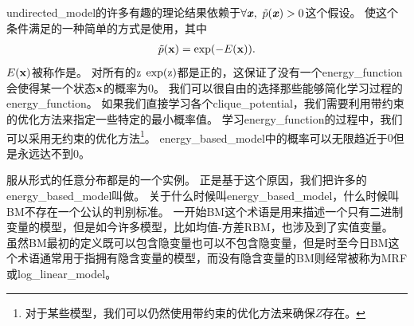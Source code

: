 \subsection{}
\label{sec:energy_based_models}


\gls{undirected_model}的许多有趣的理论结果依赖于$\forall \boldsymbol{\mathit{x}},\ \tilde{p}(\boldsymbol{\mathit{x}})>0$这个假设。
使这个条件满足的一种简单的方式是使用，其中
\begin{align}
\label{eqn:167}
\tilde{p}(\mathbf{x}) = \exp(-E(\mathbf{x})).
\end{align}
$E(\mathbf{x})$被称作是。
对所有的$\mathrm{z}$ $\exp(\mathrm{z})$都是正的，这保证了没有一个\gls{energy_function}会使得某一个状态$\mathbf{x}$的概率为$0$。
我们可以很自由的选择那些能够简化学习过程的\gls{energy_function}。
如果我们直接学习各个\gls{clique_potential}，我们需要利用带约束的优化方法来指定一些特定的最小概率值。
学习\gls{energy_function}的过程中，我们可以采用无约束的优化方法\footnote{对于某些模型，我们可以仍然使用带约束的优化方法来确保$Z$存在。}。
\gls{energy_based_model}中的概率可以无限趋近于$0$但是永远达不到$0$。


服从形式的任意分布都是的一个实例。
正是基于这个原因，我们把许多的\gls{energy_based_model}叫做\citep{Fahlman83,Ackley85,Hinton84,Hinton86a}。
关于什么时候叫\gls{energy_based_model}，什么时候叫\gls{BM}不存在一个公认的判别标准。
一开始\gls{BM}这个术语是用来描述一个只有二进制变量的模型，但是如今许多模型，比如均值-方差\gls{RBM}，也涉及到了实值变量。
虽然\gls{BM}最初的定义既可以包含隐变量也可以不包含隐变量，但是时至今日\gls{BM}这个术语通常用于指拥有隐含变量的模型，而没有隐含变量的\gls{BM}则经常被称为\gls{MRF}或\gls{log_linear_model}。



